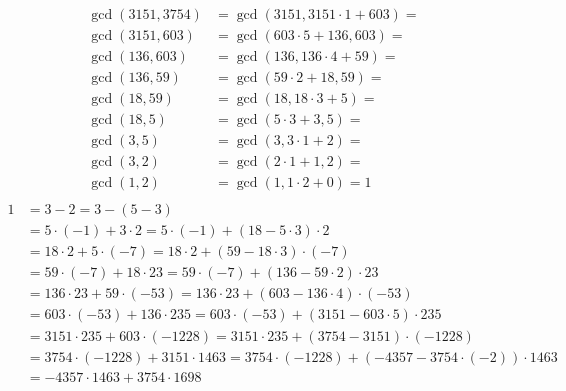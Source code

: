 \begin{description}
\begin{enumerate}
\begin{align*}
\gcd(3151, 3754)  &= \gcd(3151, 3151 \cdot 1 + 603) = \\
\gcd(3151, 603)   &= \gcd(603 \cdot 5 + 136, 603) = \\
\gcd(136, 603)    &= \gcd(136, 136 \cdot 4 + 59) = \\
\gcd(136, 59)     &= \gcd(59 \cdot 2 + 18, 59) = \\
\gcd(18, 59)      &= \gcd(18, 18 \cdot 3 + 5) = \\
\gcd(18, 5)       &= \gcd(5 \cdot 3 + 3, 5) = \\
\gcd(3, 5)        &= \gcd(3, 3 \cdot 1 + 2) = \\
\gcd(3, 2)        &= \gcd(2 \cdot 1 + 1, 2) = \\
\gcd(1, 2)        &= \gcd(1, 1 \cdot 2 + 0) = 1 \\
\end{align*}
\begin{align*}
1 &= 3 - 2 = 3 - (5 - 3) \\
  &= 5 \cdot (-1) + 3 \cdot 2 = 5 \cdot (-1) + (18 - 5 \cdot 3) \cdot 2 \\
  &= 18 \cdot 2 + 5 \cdot (-7) = 18 \cdot 2 + (59 - 18 \cdot 3) \cdot (-7) \\
  &= 59 \cdot (-7) + 18 \cdot 23 = 59 \cdot (-7) + (136 - 59 \cdot 2) \cdot 23
     \\
  &= 136 \cdot 23 + 59 \cdot (-53) = 136 \cdot 23 + (603 - 136 \cdot 4) \cdot
     (-53) \\
  &= 603 \cdot (-53) + 136 \cdot 235 = 603 \cdot (-53) + (3151 - 603 \cdot 5)
     \cdot 235 \\
  &= 3151 \cdot 235 + 603 \cdot (-1228) = 3151 \cdot 235 + (3754 - 3151)
     \cdot (-1228) \\
  &= 3754 \cdot (-1228) + 3151 \cdot 1463 = 3754 \cdot (-1228) + (-4357 -
     3754 \cdot (-2)) \cdot 1463 \\
  &= -4357 \cdot 1463 + 3754 \cdot 1698
\end{align*}
\end{enumerate}

\end{description}
